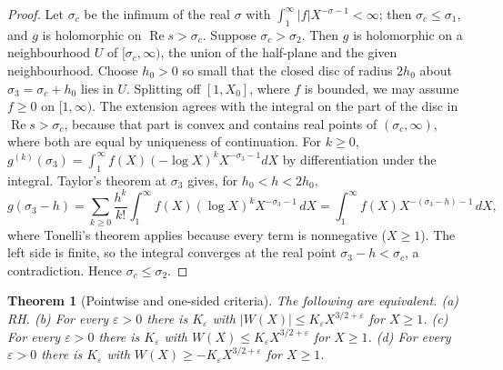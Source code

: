 \documentclass[11pt,reqno]{amsart}
\numberwithin{equation}{section}
\theoremstyle{plain}
\newtheorem{theorem}{Theorem}[section]
\theoremstyle{definition}
\theoremstyle{remark}
\newcounter{VCGreviewcount}
\newif\ifVCGshowreviews \VCGshowreviewstrue
\newcommand{\VCGreviewed}[1]{\stepcounter{VCGreviewcount}\ifVCGshowreviews\marginpar[{\raggedleft\tiny\textcolor{VCGgreen}{Reviewed\\ by Claude\\ (review~#1)}}]{\raggedright\tiny\textcolor{VCGgreen}{Reviewed\\ by Claude\\ (review~#1)}}\fi}
\begin{document}
\begin{proof}
Let $\sigma_c$ be the infimum of the real $\sigma$ with $\int_1^\infty|f|X^{-\sigma-1}<\infty$; then $\sigma_c\le\sigma_1$, and $g$ is holomorphic on $\operatorname{Re}s>\sigma_c$. Suppose $\sigma_c>\sigma_2$. Then $g$ is holomorphic on a neighbourhood $U$ of $[\sigma_c,\infty)$, the union of the half-plane and the given neighbourhood. Choose $h_0>0$ so small that the closed disc of radius $2h_0$ about $\sigma_3=\sigma_c+h_0$ lies in $U$. Splitting off $[1,X_0]$, where $f$ is bounded, we may assume $f\ge0$ on $[1,\infty)$. The extension agrees with the integral on the part of the disc in $\operatorname{Re}s>\sigma_c$, because that part is convex and contains real points of $(\sigma_c,\infty)$, where both are equal by uniqueness of continuation. For $k\ge0$, $g^{(k)}(\sigma_3)=\int_1^\infty f(X)(-\log X)^kX^{-\sigma_3-1}dX$ by differentiation under the integral. Taylor's theorem at $\sigma_3$ gives, for $h_0<h<2h_0$,
\begin{equation}\label{eq:landau}
g(\sigma_3-h)=\sum_{k\ge0}\frac{h^k}{k!}\int_1^\infty f(X)(\log X)^kX^{-\sigma_3-1}\,dX=\int_1^\infty f(X)X^{-(\sigma_3-h)-1}\,dX,
\end{equation}
where Tonelli's theorem applies because every term is nonnegative ($X\ge1$). The left side is finite, so the integral converges at the real point $\sigma_3-h<\sigma_c$, a contradiction. Hence $\sigma_c\le\sigma_2$.
\end{proof}

\begin{theorem}[Pointwise and one-sided criteria]\label{thm:Wcrit}\VCGreviewed{1}
The following are equivalent.
\textup{(a)} RH.
\textup{(b)} For every $\varepsilon>0$ there is $K_\varepsilon$ with $|W(X)|\le K_\varepsilon X^{3/2+\varepsilon}$ for $X\ge1$.
\textup{(c)} For every $\varepsilon>0$ there is $K_\varepsilon$ with $W(X)\le K_\varepsilon X^{3/2+\varepsilon}$ for $X\ge1$.
\textup{(d)} For every $\varepsilon>0$ there is $K_\varepsilon$ with $W(X)\ge-K_\varepsilon X^{3/2+\varepsilon}$ for $X\ge1$.
\end{theorem}
\end{document}
